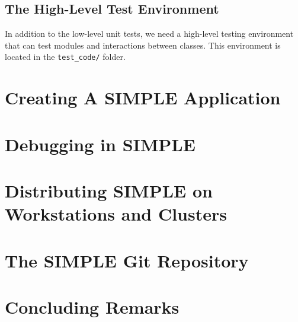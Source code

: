 \documentclass[a4paper,11pt]{article}
\begin{document}
\subsection{The High-Level Test Environment}
In addition to the low-level unit tests, we need a high-level testing environment that can test modules and interactions between classes. This environment is located in the \texttt{test\_code/} folder.


\section{Creating A SIMPLE Application}

\section{Debugging in SIMPLE}

\section{Distributing SIMPLE on Workstations and Clusters}

\section{The SIMPLE Git Repository}

\section{Concluding Remarks}
\end{document}
